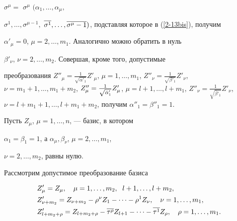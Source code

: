$\sigma^\mu=$ $\sigma^\mu$ $(\alpha_1, \dotsc, \alpha_\mu,$


$\sigma^1,\dotsc,\sigma^{\mu-1},$ $\ol{\sigma^1}, \dotsc,


\ol{\sigma^\mu-1})$, подставляя которое в (\ref{2-13bis}), получим


$\alpha'_\mu=0$, $\mu=2,\dotsc,m_1$. Аналогично можно обратить в нуль


$\beta'_\nu$, $\nu=2,\dotsc,m_2$. Совершая, кроме того, допустимые


преобразования $Z''_\mu = \frac{1}{\sqrt{\alpha'_1}} Z'_\mu$, $\mu =


1,\dotsc,m_1$, $Z''_\nu = \frac{1}{\sqrt{\beta'_1}} Z'_\nu$, $\nu =


m_1+1,\dotsc,m_1+m_2$, $Z''_\mu = \frac{1}{\sqrt{\Bar{\alpha}'_1}}


Z'_\mu$, $\mu = l+1,\dotsc,l+m_1$, $Z''_\nu =


\frac{1}{\sqrt{\bar{\beta}'_1}} Z'_\nu$, $\nu =


l+m_1+1,\dotsc,l+m_1+m_2$, получим $\alpha''_1=\beta''_1=1$.





Пусть $Z_\mu$, $\mu=1,\dotsc,n$, --- базис, в котором


$\alpha_1=\beta_1=1$, а $\alpha_\mu, \beta_\nu$, $\mu=2,\dotsc,m_1$,


$\nu=2,\dotsc,m_2$, равны нулю.





Рассмотрим допустимое преобразование базиса


\begin{equation}


\begin{split}


\label{2s1-13}


&Z'_\mu = Z_\mu, \quad \mu = 1,\dotsc,m_2, \ \; l+1,\dotsc,l+m_2,\\


&Z'_{\nu + m_2} = Z_{\nu + m_2} - \rho^\nu Z_1- \dotsb - \rho^1 Z_\nu,


\quad \nu = 1,\dotsc,m_1, \\


&Z'_{l+ m_2 +\rho} = Z_{l+ m_2 +\rho} - \ol{\tau^\rho} Z_{l+1}


- \dotsb - \ol{\tau^1} Z_\rho, \quad \rho = 1,\dotsc,m_1.


\end{split}


\end{equation}


